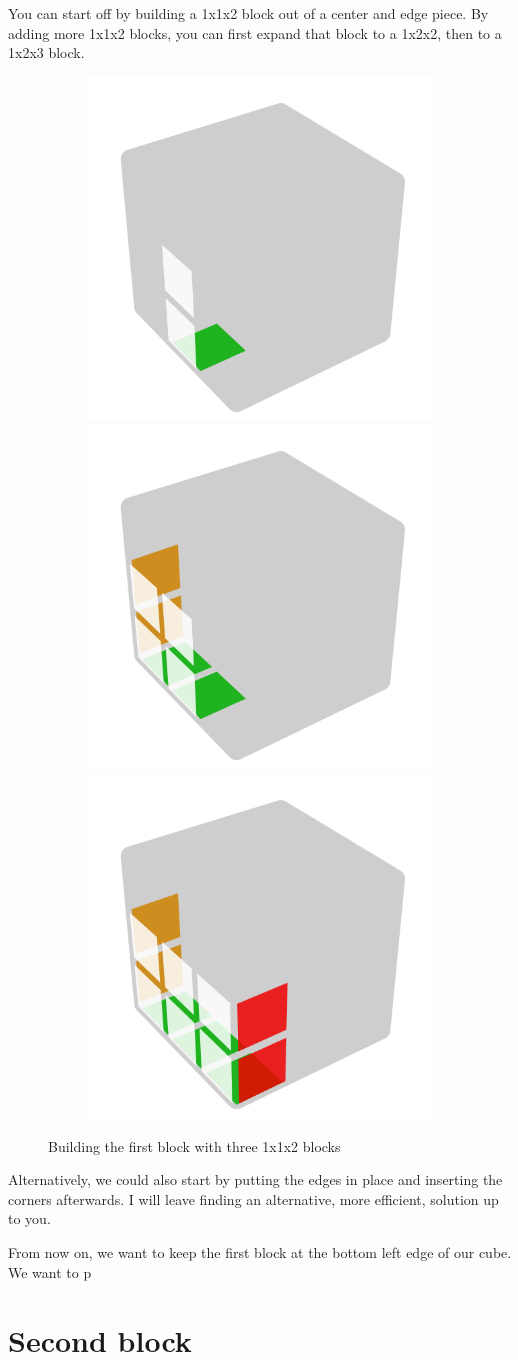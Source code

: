 \documentclass[a4paper]{scrreprt}
\begin{document}
You can start off by building a 1x1x2 block out of a center and edge piece. By adding more 1x1x2 blocks, you can first expand that block to a 1x2x2, then to a 1x2x3 block.\par

\begin{figure}[h]
\centering
\begin{subfigure}{.9\textwidth}
   \includegraphics[width=.3\linewidth]{resources/fb_1.png}
  \includegraphics[width=.3\linewidth]{resources/fb_2.png}
  \includegraphics[width=.3\linewidth]{resources/fb_3.png}
\end{subfigure}
\caption*{Building the first block with three 1x1x2 blocks}
\end{figure}

Alternatively, we could also start by putting the edges in place and inserting the corners afterwards. I will leave finding an alternative, more efficient, solution up to you.\par

From now on, we want to keep the first block at the bottom left edge of our cube. We want to p


\section{Second block}
\end{document}

